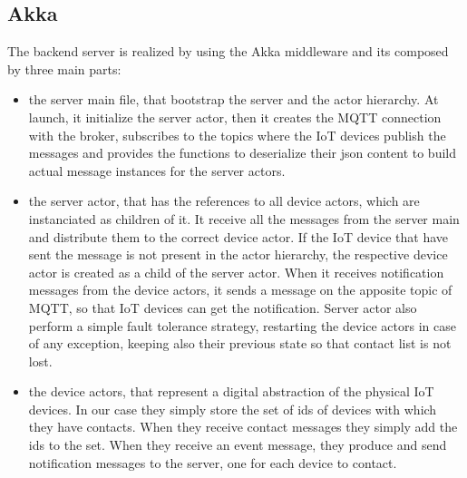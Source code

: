 \documentclass[10pt]{article}
\begin{document}
	\subsection{Akka}
	The backend server is realized by using the Akka middleware and its composed by three main parts:
	
	\begin{itemize}
		\item the server main file, that bootstrap the server and the actor hierarchy. At launch, it initialize the server actor, then it creates the MQTT connection with the broker, subscribes to the topics where the IoT devices publish the messages and provides the functions to deserialize their json content to build actual message instances for the server actors.
		\item the server actor, that has the references to all device actors, which are instanciated as children of it. It receive all the messages from the server main and distribute them to the correct device actor. If the IoT device that have sent the message is not present in the actor hierarchy, the respective device actor is created as a child of the server actor. When it receives notification messages from the device actors, it sends a message on the apposite topic of MQTT, so that IoT devices can get the notification. Server actor also perform a simple fault tolerance strategy, restarting the device actors in case of any exception, keeping also their previous state so that contact list is not lost.
		\item the device actors, that represent a digital abstraction of the physical IoT devices. In our case they simply store the set of ids of devices with which they have contacts. When they receive contact messages they simply add the ids to the set. When they receive an event message, they produce and send notification messages to the server, one for each device to contact.
	\end{itemize}      
	 
\end{document}
